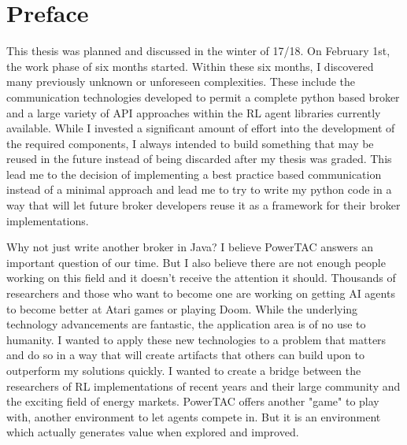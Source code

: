 \section*{Preface}

This thesis was planned and discussed in the winter of 17/18. On February 1st, the work phase of six months started.
Within these six months, I discovered many previously unknown or unforeseen complexities. These include the
communication technologies developed to permit a complete python based broker and a large variety of API approaches
within the RL agent libraries currently available. While I invested a significant amount of effort into the
development of the required components, I always intended to build something that may be reused in the future instead of
being discarded after my thesis was graded. This lead me to the decision of implementing a best practice based
communication instead of a minimal approach and lead me to try to write my python code in a way that will let
future broker developers reuse it as a framework for their broker implementations. 

Why not just write another broker in Java? I believe PowerTAC answers an important question of our time. But I also
believe there are not enough people working on this field and it doesn't receive the attention it should. Thousands of
researchers and those who want to become one are working on getting AI agents to become better at Atari games or playing
Doom. While the underlying technology advancements are fantastic, the application area is of no use to humanity. I
wanted to apply these new technologies to a problem that matters and do so in a way that will create artifacts that
others can build upon to outperform my solutions quickly. I wanted to create a bridge between the researchers of RL
implementations of recent years and their large community and the exciting field of energy markets. PowerTAC offers
another "game" to play with, another environment to let agents compete in. But it is an environment which actually
generates value when explored and improved.

